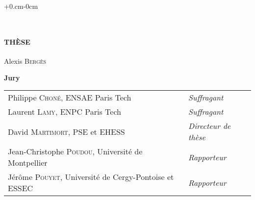 
\begin{titlepage}
\thispagestyle{empty}
\begin{adjustwidth}{+0.cm}{-0cm}
\begin{center}
 \\
\vspace*{3.5cm}
 \\
\vspace*{2.5cm}
\noindent \large \textbf{TH\`ESE} \\
\vspace*{0.4cm}
 \\
\vspace*{0.3cm}
\noindent \Large Alexis \textsc{Bergès} \\
\vspace*{2.5cm}
\end{center}
\begin{center}
\noindent \large \textbf{Jury} \\
\vspace{0.6cm}
\noindent \normalsize
\begin{tabular}{ll}
Philippe \textsc{Choné}, ENSAE Paris Tech & \textit{Suffragant} \\
Laurent \textsc{Lamy}, ENPC Paris Tech & \textit{Suffragant} \\
David \textsc{Martimort}, PSE et EHESS & \textit{Directeur de thèse}\\
Jean-Christophe \textsc{Poudou}, Université de Montpellier & \textit{Rapporteur} \\
Jérôme \textsc{Pouyet}, Université de Cergy-Pontoise et ESSEC & \textit{Rapporteur} \\
\end{tabular}
\end{center}

\end{adjustwidth}
\end{titlepage}


\cleardoublepage
\thispagestyle{empty}
\titlepage

